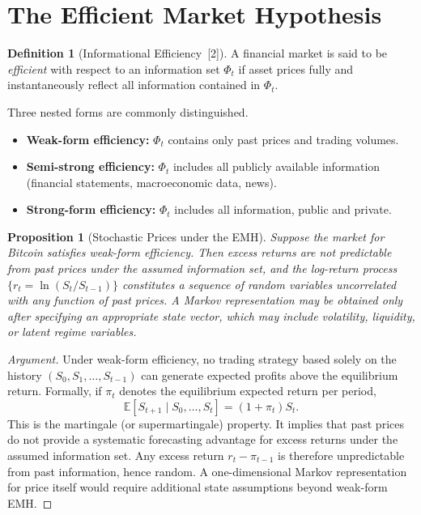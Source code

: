 \documentclass[12pt, a4paper, oneside]{report}
\theoremstyle{plain}
\newtheorem{proposition}[theorem]{Proposition}
\theoremstyle{definition}
\newtheorem{definition}[theorem]{Definition}
\theoremstyle{remark}
\newcommand{\E}{\mathbb{E}}
\begin{document}
\section{The Efficient Market Hypothesis}

\begin{definition}[Informational Efficiency~{[2]}]
A financial market is said to be \emph{efficient} with respect to an information
set $\Phi_t$ if asset prices fully and instantaneously reflect all information
contained in $\Phi_t$.
\end{definition}

Three nested forms are commonly distinguished.

\begin{itemize}[leftmargin=1.25cm]
  \item \textbf{Weak-form efficiency:} $\Phi_t$ contains only past prices and
    trading volumes.
  \item \textbf{Semi-strong efficiency:} $\Phi_t$ includes all publicly available
    information (financial statements, macroeconomic data, news).
  \item \textbf{Strong-form efficiency:} $\Phi_t$ includes all information, public
    and private.
\end{itemize}

\begin{proposition}[Stochastic Prices under the EMH]
\label{prop:emh}
Suppose the market for Bitcoin satisfies weak-form efficiency.  Then excess
returns are not predictable from past prices under the assumed information set,
and the log-return process $\{r_t = \ln(S_t / S_{t-1})\}$ constitutes a sequence
of random variables uncorrelated with any function of past prices.  A Markov
representation may be obtained only after specifying an appropriate state
vector, which may include volatility, liquidity, or latent regime variables.
\end{proposition}

\begin{proof}[Argument]
Under weak-form efficiency, no trading strategy based solely on the history
$(S_0, S_1, \ldots, S_{t-1})$ can generate expected profits above the equilibrium
return.  Formally, if $\pi_t$ denotes the equilibrium expected return per period,
\[
  \E[S_{t+1} \mid S_0, \ldots, S_t] = (1 + \pi_t) S_t.
\]
This is the martingale (or supermartingale) property.  It implies that past
prices do not provide a systematic forecasting advantage for excess returns
under the assumed information set.  Any excess return $r_t - \pi_{t-1}$ is
therefore unpredictable from past information, hence random.  A one-dimensional
Markov representation for price itself would require additional state
assumptions beyond weak-form EMH.
\end{proof}
\end{document}
